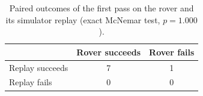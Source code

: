 \begin{table}[htbp]
\centering
\caption{Paired outcomes of the first pass on the rover and its simulator replay (exact McNemar test, $p = 1.000$).}
\label{tab:rdt_mcnemar}
\small
\begin{tabular}{lcc}
\toprule
 & Rover succeeds & Rover fails \\
\midrule
Replay succeeds & 7 & 1 \\
Replay fails & 0 & 0 \\
\bottomrule
\end{tabular}
\end{table}
